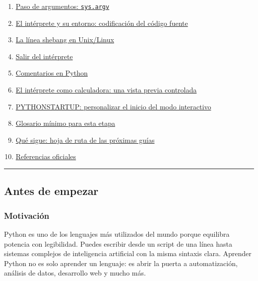 \documentclass[
  doc,
  floatsintext,
  longtable,
  a4paper,
  nolmodern,
  notxfonts,
  notimes,
  12pt,
  colorlinks=true,linkcolor=blue,citecolor=blue,urlcolor=blue]{apa7}
\begin{document}
\begin{enumerate}
  \hyperref[17-la-opciuxf3n--i-modo-interactivo-despuuxe9s-de-un-script]{La
  opción \texttt{-i}: modo interactivo después de un script}
\item
  \hyperref[18-paso-de-argumentos-sysargv]{Paso de argumentos:
  \texttt{sys.argv}}
\item
  \hyperref[19-el-intuxe9rprete-y-su-entorno-codificaciuxf3n-del-cuxf3digo-fuente]{El
  intérprete y su entorno: codificación del código fuente}
\item
  \hyperref[20-la-luxednea-shebang-en-unixlinux]{La línea shebang en
  Unix/Linux}
\item
  \hyperref[21-salir-del-intuxe9rprete]{Salir del intérprete}
\item
  \hyperref[22-comentarios-en-python]{Comentarios en Python}
\item
  \hyperref[23-el-intuxe9rprete-como-calculadora-una-vista-previa-controlada]{El
  intérprete como calculadora: una vista previa controlada}
\item
  \hyperref[24-pythonstartup-personalizar-el-inicio-del-modo-interactivo]{PYTHONSTARTUP:
  personalizar el inicio del modo interactivo}
\item
  \hyperref[25-glosario-muxednimo-para-esta-etapa]{Glosario mínimo para
  esta etapa}
\item
  \hyperref[26-quuxe9-sigue-hoja-de-ruta-de-las-pruxf3ximas-guuxedas]{Qué
  sigue: hoja de ruta de las próximas guías}
\item
  \hyperref[27-referencias-oficiales]{Referencias oficiales}
\end{enumerate}

\begin{center}\rule{0.5\linewidth}{0.5pt}\end{center}

\subsection{Antes de empezar}\label{antes-de-empezar}

\subsubsection{Motivación}\label{motivaciuxf3n}

Python es uno de los lenguajes más utilizados del mundo porque equilibra
potencia con legibilidad. Puedes escribir desde un script de una línea
hasta sistemas complejos de inteligencia artificial con la misma
sintaxis clara. Aprender Python no es solo aprender un lenguaje: es
abrir la puerta a automatización, análisis de datos, desarrollo web y
mucho más.
\end{document}
